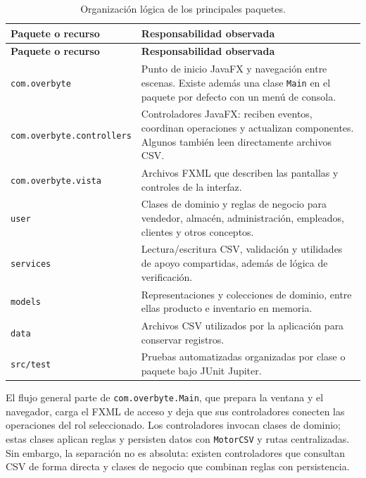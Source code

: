 \begin{longtable}{|p{3.1cm}|p{9.5cm}|}
\caption{Organización lógica de los principales paquetes.}
\label{tab:paquetes}\\
\hline
\textbf{Paquete o recurso} & \textbf{Responsabilidad observada}\\
\hline
\endfirsthead
\hline
\textbf{Paquete o recurso} & \textbf{Responsabilidad observada}\\
\hline
\endhead
\texttt{com.overbyte} & Punto de inicio JavaFX y navegación entre escenas. Existe además una clase \texttt{Main} en el paquete por defecto con un menú de consola.\\
\hline
\texttt{com.overbyte.}\newline\texttt{controllers} & Controladores JavaFX: reciben eventos, coordinan operaciones y actualizan componentes. Algunos también leen directamente archivos CSV.\\
\hline
\texttt{com.overbyte.}\newline\texttt{vista} & Archivos FXML que describen las pantallas y controles de la interfaz.\\
\hline
\texttt{user} & Clases de dominio y reglas de negocio para vendedor, almacén, administración, empleados, clientes y otros conceptos.\\
\hline
\texttt{services} & Lectura/escritura CSV, validación y utilidades de apoyo compartidas, además de lógica de verificación.\\
\hline
\texttt{models} & Representaciones y colecciones de dominio, entre ellas producto e inventario en memoria.\\
\hline
\texttt{data} & Archivos CSV utilizados por la aplicación para conservar registros.\\
\hline
\texttt{src/test} & Pruebas automatizadas organizadas por clase o paquete bajo JUnit Jupiter.\\
\hline
\end{longtable}

El flujo general parte de \texttt{com.overbyte.Main}, que prepara la ventana y el navegador, carga el FXML de acceso y deja que sus controladores conecten las operaciones del rol seleccionado. Los controladores invocan clases de dominio; estas clases aplican reglas y persisten datos con \texttt{MotorCSV} y rutas centralizadas. Sin embargo, la separación no es absoluta: existen controladores que consultan CSV de forma directa y clases de negocio que combinan reglas con persistencia.

